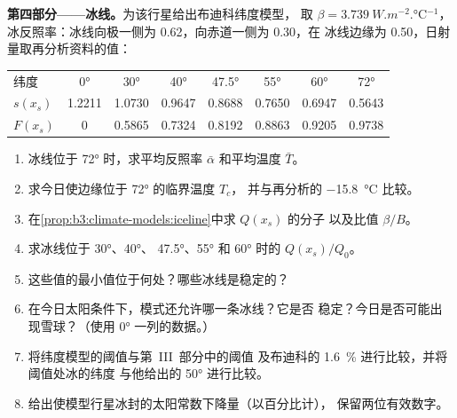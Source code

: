 \begin{problem}
\medskip\noindent\textbf{第四部分——冰线。}为该行星给出布迪科纬度模型，
取 $\beta = \qty{3.739}{W.m^{-2}.\celsius^{-1}}$，
冰反照率：冰线向极一侧为 0.62，向赤道一侧为 0.30，在
冰线边缘为 0.50，日射量取再分析资料的值：
\begin{center}
\begin{tabular}{lccccccc}
\hline
纬度 & \ang{0} & \ang{30} & \ang{40} & \ang{47.5} & \ang{55} & \ang{60} & \ang{72}\\
$s(x_s)$ & 1.2211 & 1.0730 & 0.9647 & 0.8688 & 0.7650 & 0.6947 & 0.5643\\
$F(x_s)$ & 0 & 0.5865 & 0.7324 & 0.8192 & 0.8863 & 0.9205 & 0.9738\\
\hline
\end{tabular}
\end{center}
\begin{enumerate}[resume]
\item 冰线位于 \ang{72} 时，求平均反照率 $\bar\alpha$
  和平均温度 $\bar T$。
\item 求今日使边缘位于 \ang{72} 的临界温度 $T_c$，
  并与再分析的 \qty{-15.8}{\celsius} 比较。
\item 在\cref{prop:b3:climate-models:iceline}中求 $Q(x_s)$ 的分子
  以及比值 $\beta/B$。
\item 求冰线位于 \ang{30}、\ang{40}、
  \ang{47.5}、\ang{55} 和 \ang{60} 时的 $Q(x_s)/Q_0$。
\item 这些值的最小值位于何处？哪些冰线是稳定的？
\item 在今日太阳条件下，模式还允许哪一条冰线？它是否
  稳定？今日是否可能出现雪球？（使用 \ang{0} 一列的数据。）
\item 将纬度模型的阈值与第~III~部分中的阈值
  及布迪科的 \qty{1.6}{\percent} 进行比较，并将阈值处冰的纬度
  与他给出的 \ang{50} 进行比较。
\item 给出使模型行星冰封的太阳常数下降量（以百分比计），
  保留两位有效数字。
\end{enumerate}
\end{problem}

